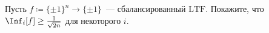 Пусть $f\coloneqq \{\pm 1\}^n \to \{\pm 1\}$~--- сбалансированный $\mathrm{LTF}$. Покажите, что
$\Inf_i[f] \ge \frac{1}{\sqrt{2 n}}$ для некоторого $i$.

